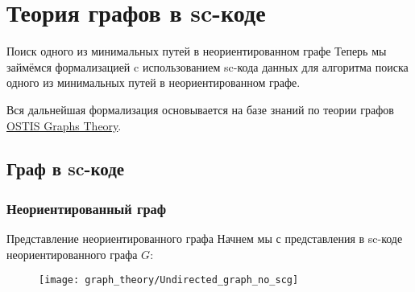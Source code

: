 % 
% 
%
% 
% 

\section{Теория графов в sc-коде}

\begin{frame}{Поиск одного из минимальных путей в неориентированном графе}
  Теперь мы займёмся формализацией c использованием sc-кода данных для
  алгоритма поиска одного из минимальных путей в неориентированном
  графе.

  Вся дальнейшая формализация основывается на базе знаний по теории
  графов
  \href{http://ostisgraphstheo.sourceforge.net/index.php/Заглавная_страница}{OSTIS Graphs Theory}.
\end{frame}

\subsection{Граф в sc-коде}

\subsubsection{Неориентированный граф}

\begin{frame}{Представление неориентированного графа}
  Начнем мы с представления в sc-коде неориентированного графа $G$:

  \begin{figure}
    \centering
    \texttt{[image: graph\_theory/Undirected\_graph\_no\_scg]}
  \end{figure}
\end{frame}

